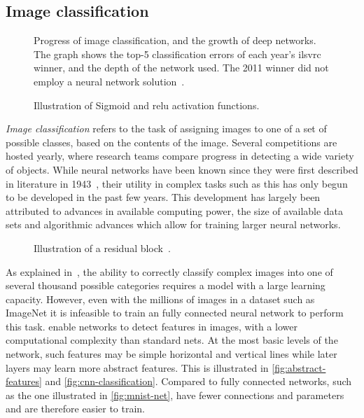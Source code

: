 \documentclass[\rootfolder/main.tex]{subfiles}
\begin{document}
\subsection{Image classification}

\begin{figure}
    \caption[The influence of deep learning on image classification error rates.]%
            {Progress of image classification, and the growth of deep networks. %
            The graph shows the top-5 classification errors of each year's \acrshort{ilsvrc} winner, and the depth of the network used. %
            The 2011 winner did not employ a neural network solution~\cite{Krizhevsky2012}\cite{Zeiler2013}\cite{Szegedy2014}\cite{He2016}.}
    \label{fig:ilsvrc}
\end{figure}

\begin{wrapfigure}{R}{0.5\columnwidth}
    \caption{Illustration of Sigmoid and \acrshort{relu} activation functions.}
    \label{fig:activation-functions}
\end{wrapfigure}

\emph{Image classification} refers to the task of assigning images to one of a set of possible classes, based on the contents of the image.
Several competitions are hosted yearly, where research teams compare progress in detecting a wide variety of objects.
While neural networks have been known since they were first described in literature in 1943~\cite{Mitchell1997}\cite{Mcculloch1943}, their utility in complex tasks such as this has only begun to be developed in the past few years.
This development has largely been attributed to advances in available computing power, the size of available data sets and algorithmic advances which allow for training larger neural networks.

\begin{wrapfigure}{R}{0.5\columnwidth}
    \caption[Illustration of a residual block.]{Illustration of a residual block~\cite{He2016}.}
    \label{fig:residual-block}
\end{wrapfigure}

As explained in~\cite{Krizhevsky2012}, the ability to correctly classify complex images into one of several thousand possible categories requires a model with a large learning capacity.
However, even with the millions of images in a dataset such as ImageNet it is infeasible to train an fully connected neural network to perform this task.
 enable networks to detect features in images, with a lower computational complexity than standard nets.
At the most basic levels of the network, such features may be simple horizontal and vertical lines while later layers may learn more abstract features.
This is illustrated in \cref{fig:abstract-features} and \cref{fig:cnn-classification}.
Compared to fully connected networks, such as the one illustrated in \cref{fig:mnist-net},  have fewer connections and parameters and are therefore easier to train.
\end{document}
